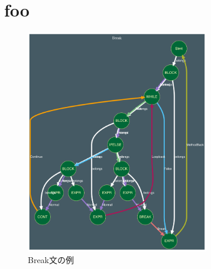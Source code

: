 \section{foo}



\begin{figure}[htbp]
    \begin{center}
    \includegraphics[width=8cm]{./img/Break.png}
    \caption{Break文の例}
    \label{fig:Break}
    \end{center}
\end{figure}
